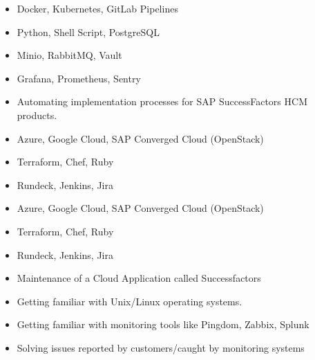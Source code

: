 \documentclass[10pt,a4paper,ragged2e,withhyper]{altacv}
\let\olditem\item
\renewcommand{\item}{\small\olditem}
\begin{document}
\begin{paracol}{2}

\begin{itemize}
\item Docker, Kubernetes, GitLab Pipelines
\item Python, Shell Script, PostgreSQL
\item Minio, RabbitMQ, Vault
\item Grafana, Prometheus, Sentry
\end{itemize}
\divider

\begin{itemize}
\item Automating implementation processes for SAP SuccessFactors HCM products. 
\item Azure, Google Cloud, SAP Converged Cloud (OpenStack)
\item Terraform, Chef, Ruby
\item Rundeck, Jenkins, Jira
\end{itemize}
\divider

\begin{itemize}
\item Azure, Google Cloud, SAP Converged Cloud (OpenStack)
\item Terraform, Chef, Ruby
\item Rundeck, Jenkins, Jira
\end{itemize}
\divider

\begin{itemize}
\item Maintenance of a Cloud Application called Successfactors
\item Getting familiar with Unix/Linux operating systems.
\item Getting familiar with monitoring tools like Pingdom, Zabbix, Splunk
\item Solving issues reported by customers/caught by monitoring systems 
\end{itemize}
\divider


\end{paracol}
\end{document}
